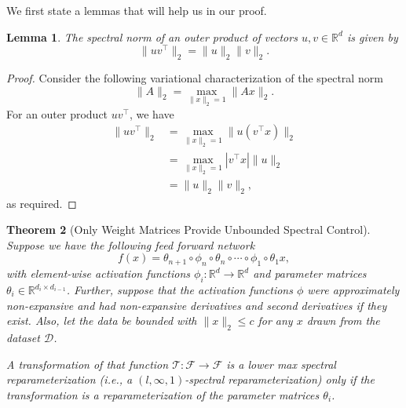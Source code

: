 \documentclass{article}
\theoremstyle{plain}
\newtheorem{theorem}{Theorem}
\newtheorem{lemma}[theorem]{Lemma}
\theoremstyle{definition}
\theoremstyle{remark}
\begin{document}
We first state a lemmas that will help us in our proof.
\begin{lemma}
\label{lemma:outer-product-spectral-norm}
The spectral norm of an outer product of vectors $u,v \in \mathbb{R}^d$ is given by \[
\|uv^{\top}\|_2 = \|u\|_2 \|v \|_2.
\]
\end{lemma}
\begin{proof}
Consider the following variational characterization of the spectral norm \[
\|A\|_2 = \max_{\|x\|_2 = 1} \|Ax\|_2.
\]
For an outer product $uv^{\top}$, we have 
\begin{align*}
\|uv^{\top}\|_2 &= \max_{\|x\|_2 = 1} \|u(v^{\top}x)\|_2 \\
&= \max_{\|x\|_2 = 1} |v^{\top}x| \|u\|_2 \tag{absolute homogeneity} \\
&= \|u\|_2\|v\|_2,   \tag{by Cauchy-Schwarz, max at $x = v/\|v\|_2$}
\end{align*}
as required.
\end{proof}

\begin{theorem}[Only Weight Matrices Provide Unbounded Spectral Control]
\label{thm:only-weight-matrices}
Suppose we have the following feed forward network \[
f(x) =  \theta_{n+1} \circ \phi_{n} \circ \theta_{n} \circ \cdots \circ \phi_1 \circ \theta_1x,
\] with element-wise activation functions $\phi_i: \mathbb{R}^d \to \mathbb{R}^d$ and parameter matrices $\theta_i \in \mathbb{R}^{d_i \times d_{i-1}}$. Further, suppose that the activation functions $\phi$ were approximately non-expansive and had non-expansive derivatives and second derivatives if they exist. Also, let the data be bounded with $\|x\|_2 \leq c$ for any $x$ drawn from the dataset $\mathcal{D}$.

A transformation of that function $\mathcal{T}: \mathcal{F} \to \mathcal{F}$ is a lower max spectral reparameterization (i.e., a $(l, \infty, 1)$-spectral reparameterization)  only if the transformation is a reparameterization of the parameter matrices $\theta_i$.
\end{theorem}
\end{document}
